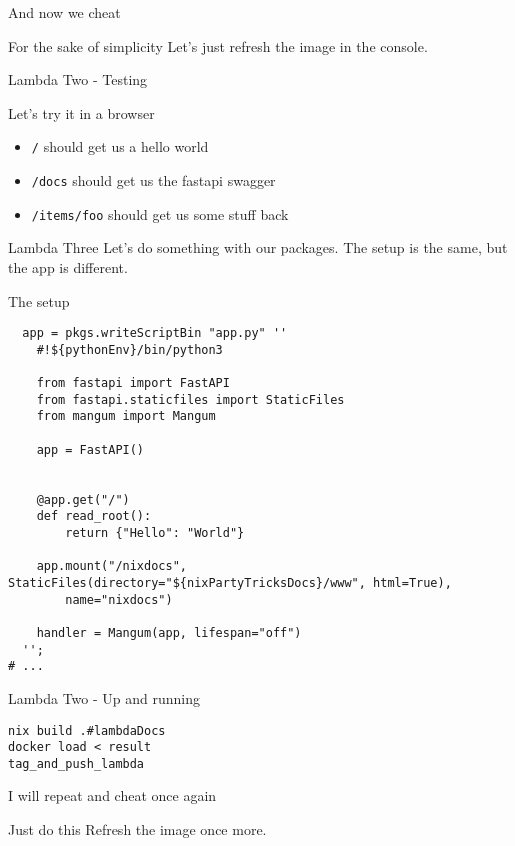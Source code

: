 \documentclass[bigger]{beamer}
\begin{document}
\begin{frame}[label={sec:org18eca6d}]{And now we cheat}
\begin{exampleblock}{For the sake of simplicity}
Let's just refresh the image in the console.
\end{exampleblock}
\end{frame}
\begin{frame}[label={sec:org789568d},fragile]{Lambda Two - Testing}
 \begin{exampleblock}{Let's try it in a browser}
\begin{itemize}
\item \texttt{/} should get us a hello world
\item \texttt{/docs} should get us the fastapi swagger
\item \texttt{/items/foo} should get us some stuff back
\end{itemize}
\end{exampleblock}
\end{frame}
\begin{frame}[label={sec:org9736064},fragile]{Lambda Three}
 Let's do something with our packages.
The setup is the same, but the app is different.
\begin{block}{The setup}
\tiny
\begin{verbatim}
  app = pkgs.writeScriptBin "app.py" ''
    #!${pythonEnv}/bin/python3

    from fastapi import FastAPI
    from fastapi.staticfiles import StaticFiles
    from mangum import Mangum

    app = FastAPI()


    @app.get("/")
    def read_root():
        return {"Hello": "World"}

    app.mount("/nixdocs", StaticFiles(directory="${nixPartyTricksDocs}/www", html=True),
        name="nixdocs")

    handler = Mangum(app, lifespan="off")
  '';
# ...
\end{verbatim}
\end{block}
\end{frame}
\begin{frame}[label={sec:orgfec6870},fragile]{Lambda Two - Up and running}
 \tiny
\begin{verbatim}
nix build .#lambdaDocs
docker load < result
tag_and_push_lambda
\end{verbatim}
\end{frame}
\begin{frame}[label={sec:org977cfbd}]{I will repeat and cheat once again}
\begin{exampleblock}{Just do this}
Refresh the image once more.
\end{exampleblock}
\end{frame}
\end{document}
